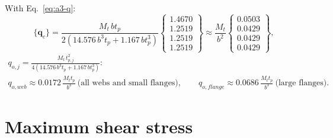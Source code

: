 With Eq.~\eqref{eq:a3-q}:
\begin{equation}
  \{\mathbf{q}_c\} = \frac{M_t\,bt_p}{2\left(14.576\,b^3t_p + 1.167\,bt_p^3\right)}
  \begin{Bmatrix} 1.4670\\ 1.2519\\ 1.2519\\ 1.2519 \end{Bmatrix}
  \approx \frac{M_t}{b^2}\begin{Bmatrix} 0.0503\\ 0.0429\\ 0.0429\\ 0.0429 \end{Bmatrix},
\end{equation}
\begin{gather}
  q_{o,j} = \frac{M_t\,t_{p,j}^2}{4\left(14.576\,b^3t_p + 1.167\,bt_p^3\right)}:\\
  q_{o,web} \approx 0.0172\,\frac{M_tt_p}{b^3}\ \text{(all webs and small flanges)},
  \qquad
  q_{o,flange} \approx 0.0686\,\frac{M_tt_p}{b^3}\ \text{(large flanges)} .\nonumber
\end{gather}


\section{Maximum shear stress}
\label{sec:a3-4}

